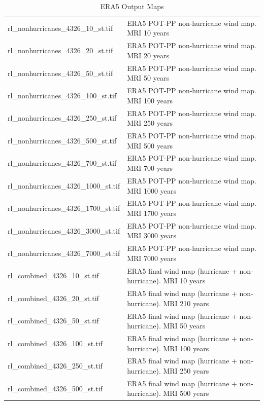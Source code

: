 \documentclass[12pt,twoside]{reedthesis}
\begin{document}
\begingroup\fontsize{8}{10}\selectfont
\begin{longtable}[t]{>{\raggedright\arraybackslash}p{2in}>{\raggedright\arraybackslash}p{3.6in}}
\caption[ERA5 Output Maps]{\label{tab:era5maps}ERA5 Output Maps}\\
\toprule
\multicolumn{1}{l}{File} & \multicolumn{1}{l}{Description}\\
\midrule
rl\_nonhurricanes\_4326\_10\_st.tif & ERA5 POT-PP non-hurricane wind map. MRI 10 years\\
rl\_nonhurricanes\_4326\_20\_st.tif & ERA5 POT-PP non-hurricane wind map. MRI 20 years\\
rl\_nonhurricanes\_4326\_50\_st.tif & ERA5 POT-PP non-hurricane wind map. MRI 50 years\\
rl\_nonhurricanes\_4326\_100\_st.tif & ERA5 POT-PP non-hurricane wind map. MRI 100 years\\
rl\_nonhurricanes\_4326\_250\_st.tif & ERA5 POT-PP non-hurricane wind map. MRI 250 years\\
rl\_nonhurricanes\_4326\_500\_st.tif & ERA5 POT-PP non-hurricane wind map. MRI 500 years\\
rl\_nonhurricanes\_4326\_700\_st.tif & ERA5 POT-PP non-hurricane wind map. MRI 700 years\\
rl\_nonhurricanes\_4326\_1000\_st.tif & ERA5 POT-PP non-hurricane wind map. MRI 1000 years\\
rl\_nonhurricanes\_4326\_1700\_st.tif & ERA5 POT-PP non-hurricane wind map. MRI 1700 years\\
rl\_nonhurricanes\_4326\_3000\_st.tif & ERA5 POT-PP non-hurricane wind map. MRI 3000 years\\
rl\_nonhurricanes\_4326\_7000\_st.tif & ERA5 POT-PP non-hurricane wind map. MRI 7000 years\\
rl\_combined\_4326\_10\_st.tif & ERA5 final wind map (hurricane + non-hurricane). MRI 10 years\\
rl\_combined\_4326\_20\_st.tif & ERA5 final wind map (hurricane + non-hurricane). MRI 210 years\\
rl\_combined\_4326\_50\_st.tif & ERA5 final wind map (hurricane + non-hurricane). MRI 50 years\\
rl\_combined\_4326\_100\_st.tif & ERA5 final wind map (hurricane + non-hurricane). MRI 100 years\\
rl\_combined\_4326\_250\_st.tif & ERA5 final wind map (hurricane + non-hurricane). MRI 250 years\\
rl\_combined\_4326\_500\_st.tif & ERA5 final wind map (hurricane + non-hurricane). MRI 500 years\\

\end{longtable}
\end{document}
